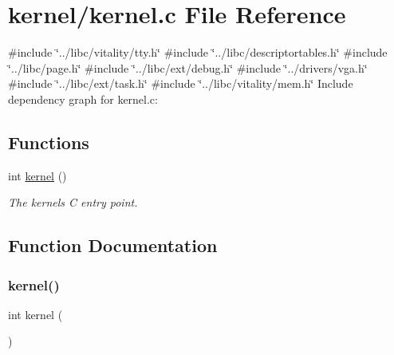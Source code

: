 \hypertarget{a00032}{}\section{kernel/kernel.c File Reference}
\label{a00032}
{\ttfamily \#include \char`\"{}../libc/vitality/tty.\+h\char`\"{}}\newline
{\ttfamily \#include \char`\"{}../libc/descriptortables.\+h\char`\"{}}\newline
{\ttfamily \#include \char`\"{}../libc/page.\+h\char`\"{}}\newline
{\ttfamily \#include \char`\"{}../libc/ext/debug.\+h\char`\"{}}\newline
{\ttfamily \#include \char`\"{}../drivers/vga.\+h\char`\"{}}\newline
{\ttfamily \#include \char`\"{}../libc/ext/task.\+h\char`\"{}}\newline
{\ttfamily \#include \char`\"{}../libc/vitality/mem.\+h\char`\"{}}\newline
Include dependency graph for kernel.\+c\+:
\subsection*{Functions}
\begin{DoxyCompactItemize}
\item 
int \hyperlink{a00032_a4ee3d1f05046b7afc6b4d516bf10667a_a4ee3d1f05046b7afc6b4d516bf10667a}{kernel} ()
\begin{DoxyCompactList}\small\item\em The kernels C entry point. \end{DoxyCompactList}\end{DoxyCompactItemize}


\subsection{Function Documentation}
\mbox{\label{a00032_a4ee3d1f05046b7afc6b4d516bf10667a_a4ee3d1f05046b7afc6b4d516bf10667a}} 
\subsubsection{\texorpdfstring{kernel()}{kernel()}}
{\footnotesize\ttfamily int kernel (\begin{DoxyParamCaption}{ }\end{DoxyParamCaption})}



